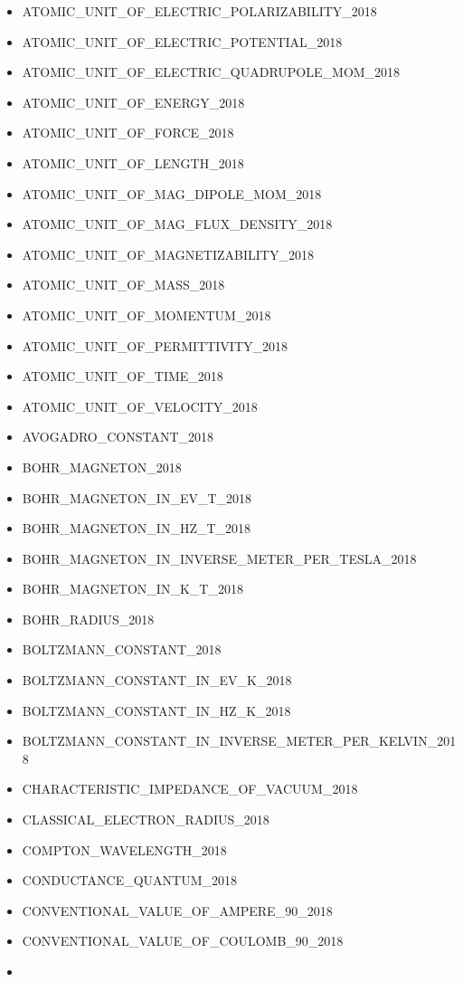 \begin{itemize}
\item
  ATOMIC\_UNIT\_OF\_ELECTRIC\_POLARIZABILITY\_2018
\item
  ATOMIC\_UNIT\_OF\_ELECTRIC\_POTENTIAL\_2018
\item
  ATOMIC\_UNIT\_OF\_ELECTRIC\_QUADRUPOLE\_MOM\_2018
\item
  ATOMIC\_UNIT\_OF\_ENERGY\_2018
\item
  ATOMIC\_UNIT\_OF\_FORCE\_2018
\item
  ATOMIC\_UNIT\_OF\_LENGTH\_2018
\item
  ATOMIC\_UNIT\_OF\_MAG\_DIPOLE\_MOM\_2018
\item
  ATOMIC\_UNIT\_OF\_MAG\_FLUX\_DENSITY\_2018
\item
  ATOMIC\_UNIT\_OF\_MAGNETIZABILITY\_2018
\item
  ATOMIC\_UNIT\_OF\_MASS\_2018
\item
  ATOMIC\_UNIT\_OF\_MOMENTUM\_2018
\item
  ATOMIC\_UNIT\_OF\_PERMITTIVITY\_2018
\item
  ATOMIC\_UNIT\_OF\_TIME\_2018
\item
  ATOMIC\_UNIT\_OF\_VELOCITY\_2018
\item
  AVOGADRO\_CONSTANT\_2018
\item
  BOHR\_MAGNETON\_2018
\item
  BOHR\_MAGNETON\_IN\_EV\_T\_2018
\item
  BOHR\_MAGNETON\_IN\_HZ\_T\_2018
\item
  BOHR\_MAGNETON\_IN\_INVERSE\_METER\_PER\_TESLA\_2018
\item
  BOHR\_MAGNETON\_IN\_K\_T\_2018
\item
  BOHR\_RADIUS\_2018
\item
  BOLTZMANN\_CONSTANT\_2018
\item
  BOLTZMANN\_CONSTANT\_IN\_EV\_K\_2018
\item
  BOLTZMANN\_CONSTANT\_IN\_HZ\_K\_2018
\item
  BOLTZMANN\_CONSTANT\_IN\_INVERSE\_METER\_PER\_KELVIN\_2018
\item
  CHARACTERISTIC\_IMPEDANCE\_OF\_VACUUM\_2018
\item
  CLASSICAL\_ELECTRON\_RADIUS\_2018
\item
  COMPTON\_WAVELENGTH\_2018
\item
  CONDUCTANCE\_QUANTUM\_2018
\item
  CONVENTIONAL\_VALUE\_OF\_AMPERE\_90\_2018
\item
  CONVENTIONAL\_VALUE\_OF\_COULOMB\_90\_2018
\item

\end{itemize}
